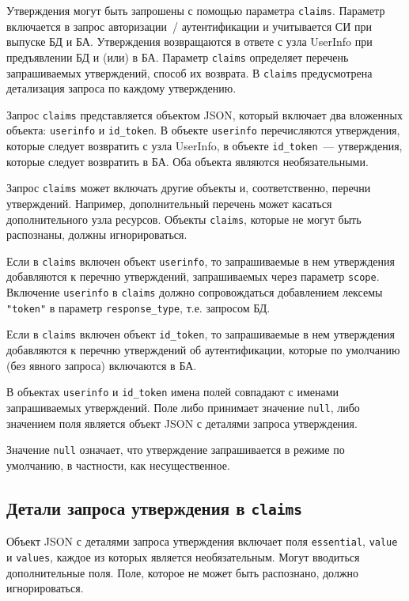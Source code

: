 Утверждения могут быть запрошены с помощью параметра \lstinline{claims}. 
Параметр включается в запрос авторизации~/ аутентификации и учитывается СИ при 
выпуске БД и БА.
%
Утверждения возвращаются в ответе с узла UserInfo при предъявлении БД и (или) в 
БА. 
%
Параметр \lstinline{claims} определяет перечень запрашиваемых утверждений, 
способ их возврата. 
%
В \lstinline{claims} предусмотрена детализация запроса по каждому утверждению.

Запрос \lstinline{claims} представляется объектом JSON, который включает два 
вложенных объекта: \lstinline{userinfo} и \lstinline{id_token}.
%
В объекте \lstinline{userinfo} перечисляются утверждения, которые следует возвратить 
с узла UserInfo, в объекте \lstinline{id_token}~--- утверждения, которые 
следует возвратить в БА.
%
Оба объекта являются необязательными.

Запрос \lstinline{claims} может включать другие объекты и, соответственно, 
перечни утверждений. Например, дополнительный перечень может касаться 
дополнительного узла ресурсов. Объекты \lstinline{claims}, которые не могут 
быть распознаны, должны игнорироваться.

Если в \lstinline{claims} включен объект \lstinline{userinfo}, то запрашиваемые 
в нем утверждения добавляются к перечню утверждений, запрашиваемых через 
параметр \lstinline{scope}. Включение \lstinline{userinfo} в \lstinline{claims}
должно сопровождаться добавлением лексемы \lstinline{"token"} в параметр
\lstinline{response_type}, т.е. запросом БД.

Если в \lstinline{claims} включен объект \lstinline{id_token}, то запрашиваемые 
в нем утверждения добавляются к перечню утверждений об аутентификации, 
которые по умолчанию (без явного запроса) включаются в БА. 

В объектах \lstinline{userinfo} и \lstinline{id_token} имена полей совпадают
с именами запрашиваемых утверждений. Поле либо принимает значение 
\lstinline{null}, либо значением поля является объект JSON с деталями запроса 
утверждения. 

Значение \lstinline{null} означает, что утверждение запрашивается
в режиме по умолчанию, в частности, как несущественное. 

\subsection{Детали запроса утверждения в \lstinline{claims}}\label{CLAIMS.IndClaim}

Объект JSON с деталями запроса утверждения включает поля 
\lstinline{essential}, \lstinline{value} и \lstinline{values},
каждое из которых является необязательным.
%
Могут вводиться дополнительные поля.  
%
Поле, которое не может быть распознано, должно игнорироваться.

